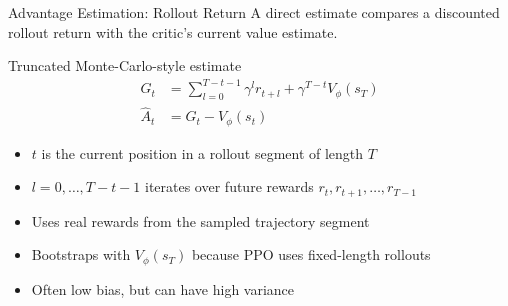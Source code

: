 \documentclass[aspectratio=169, 11pt]{beamer}
\begin{document}
\begin{frame}{Advantage Estimation: Rollout Return}
  A direct estimate compares a discounted rollout return with the critic's
  current value estimate.

  \vspace{0.5em}
  \begin{block}{Truncated Monte-Carlo-style estimate}
    \begin{align*}
      G_t &= \sum_{l=0}^{T-t-1} \gamma^l r_{t+l}
             + \gamma^{T-t} V_\phi(s_T) \\
      \hat{A}_t &= G_t - V_\phi(s_t)
    \end{align*}
  \end{block}

  \begin{itemize}
    \item $t$ is the current position in a rollout segment of length $T$
    \item $l=0,\ldots,T-t-1$ iterates over future rewards
          $r_t, r_{t+1}, \ldots, r_{T-1}$
    \item Uses real rewards from the sampled trajectory segment
    \item Bootstraps with $V_\phi(s_T)$ because PPO uses fixed-length rollouts
    \item Often low bias, but can have high variance
  \end{itemize}
\end{frame}
\end{document}
